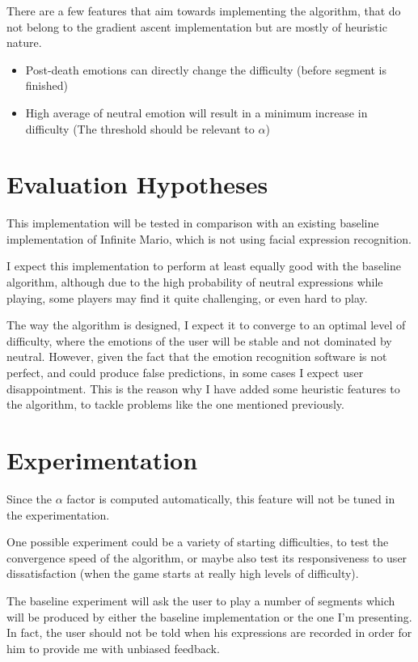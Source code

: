 \documentclass[11pt]{article}
\begin{document}
There are a few features that aim towards implementing the algorithm, that do not belong to the gradient ascent implementation but are mostly of heuristic nature.
\begin{itemize}
\item Post-death emotions can directly change the difficulty (before segment is finished)
\item High average of neutral emotion will result in a minimum increase in difficulty (The threshold should be relevant to $\alpha$)
\end{itemize}

\section{Evaluation Hypotheses}
This implementation will be tested in comparison with an existing baseline implementation of Infinite Mario, which is not using facial expression recognition. 

I expect this implementation to perform at least equally good with the baseline algorithm, although due to the high probability of neutral expressions while playing, some players may find it quite challenging, or even hard to play.

The way the algorithm is designed, I expect it to converge to an optimal level of difficulty, where the emotions of the user will be stable and not dominated by neutral. However, given the fact that the emotion recognition software is not perfect, and could produce false predictions, in some cases I expect user disappointment. This is the reason why I have added some heuristic features to the algorithm, to tackle problems like the one mentioned previously.


\section{Experimentation}

Since the $\alpha$ factor is computed automatically, this feature will not be tuned in the experimentation. 

One possible experiment could be a variety of starting difficulties, to test the convergence speed of the algorithm, or maybe also test its responsiveness to user dissatisfaction (when the game starts at really high levels of difficulty). 

The baseline experiment will ask the user to play a number of segments which will be produced by either the baseline implementation or the one I'm presenting. In fact, the user should not be told when his expressions are recorded in order for him to provide me with unbiased feedback. 
\end{document}
